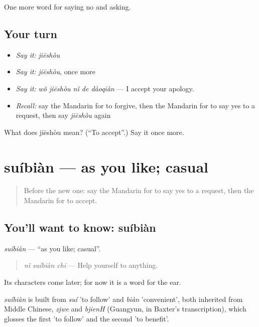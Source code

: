 \begin{grammarlens}[title={What you've built}]
One more word for saying no and asking.
\end{grammarlens}

\subsection*{Your turn}
\begin{itemize}
\raggedright
  \item \emph{Say it:} \emph{jiēshòu}
  \item \emph{Say it:} \emph{jiēshòu}, once more
  \item \emph{Say it:} \emph{wǒ jiēshòu nǐ de dàoqiàn} — I accept your apology.
  \item \emph{Recall:} say the Mandarin for to forgive, then the Mandarin for to say yes to a request, then say \emph{jiēshòu} again
\end{itemize}

\begin{tcolorbox}[breakable,colback=teal!4,colframe=teal!35!black,title={Before you move on}]
What does jiēshòu mean? (\textquotedblleft{}To accept\textquotedblright{}.) Say it once more.
\end{tcolorbox}
\section[suíbiàn]{suíbiàn — as you like; casual}

\label{lesson:ZH-C275-suibian}



\begin{quote}
Before the new one: say the Mandarin for to say yes to a request, then the Mandarin for to accept.
\end{quote}

\subsection*{You'll want to know: suíbiàn}
\emph{suíbiàn} — \textquotedblleft{}as you like; casual\textquotedblright{}.

\begin{quote}
\emph{nǐ suíbiàn chī} — Help yourself to anything.
\end{quote}

Its characters come later; for now it is a word for the ear.

\begin{cousinweb}
\emph{suíbiàn} is built from \emph{suí} 'to follow' and \emph{biàn} 'convenient', both inherited from Middle Chinese, \emph{zjwe} and \emph{bjienH} (Guangyun, in Baxter's transcription), which glosses the first 'to follow' and the second 'to benefit'.
\end{cousinweb}

